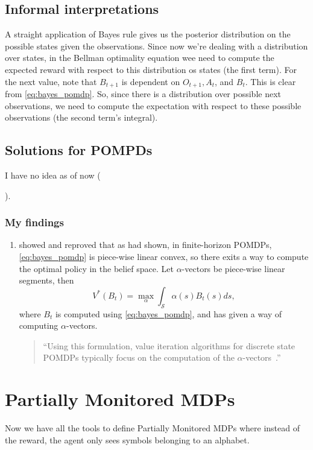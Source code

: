 \documentclass[a4paper]{article}
\theoremstyle{definition}
\newcommand{\cS}{\mathcal{S}}
\begin{document}
\subsection{Informal interpretations}
A straight application of Bayes rule gives us the posterior distribution on the possible states given the observations. Since now we're dealing with a distribution over states, in the Bellman optimality equation wee need to compute the expected reward with respect to this distribution os states (the first term). For the next value, note that $B_{t + 1}$ is dependent on $O_{t + 1}, A_t$, and $B_t$. This is clear from \cref{eq:bayes_pomdp}. So, since there is a distribution over possible next observations, we need to compute the expectation with respect to these possible observations (the second term's integral). 

\subsection{Solutions for POMPDs}
I have no idea as of now (\date{\today}). 
\subsubsection{My findings}
\begin{enumerate}
    \item \citet[Lemma 1]{porta2006pointbased} showed and reproved that as \citet{sondik1978optimalcontrol} had shown, in finite-horizon POMDPs, \cref{eq:bayes_pomdp} is piece-wise linear convex, so there exits a way to compute the optimal policy in the belief space. Let $\alpha$-vectors be piece-wise linear segments, then
    \begin{equation*}
        V^*(B_t) = \max_\alpha \int_\cS \alpha(s)B_t(s)ds,
    \end{equation*}
    where $B_t$ is computed using \cref{eq:bayes_pomdp}, and \citet{porta2006pointbased} has given a way of computing $\alpha$-vectors.
    \begin{quote}
        ``Using this formulation, value iteration algorithms for discrete state POMDPs typically focus on the computation of the $\alpha$-vectors~\citep{porta2006pointbased}.''
    \end{quote}
\end{enumerate}

\section{Partially Monitored MDPs}
Now we have all the tools to define Partially Monitored MDPs where instead of the reward, the agent only sees symbols belonging to an alphabet. 
\end{document}
